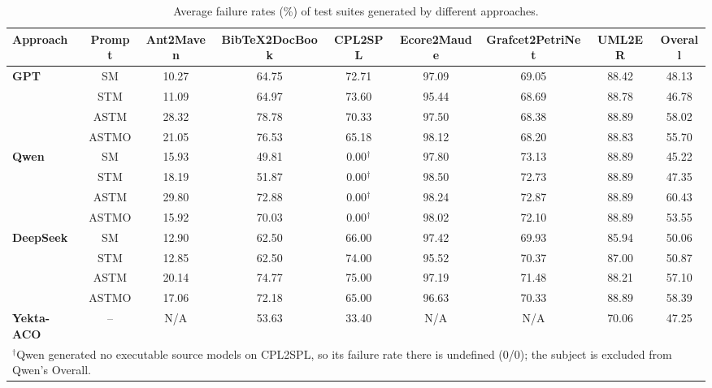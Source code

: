 \begin{table}[t]
\centering
\caption{Average failure rates (\%) of test suites generated by different approaches.}
\label{tab:rq2-failure-rate}
\setlength{\tabcolsep}{3pt}
\begin{tabular}{lcccccccc}
\toprule
\textbf{Approach} & \textbf{Prompt} & \textbf{Ant2Maven} & \textbf{BibTeX2DocBook} & \textbf{CPL2SPL} & \textbf{Ecore2Maude} & \textbf{Grafcet2PetriNet} & \textbf{UML2ER} & \textbf{Overall}\\
\midrule
\multirow{4}{*}{\textbf{GPT}}
  & SM & 10.27 & 64.75 & 72.71 & 97.09 & 69.05 & 88.42 & 48.13 \\
  & STM & 11.09 & 64.97 & 73.60 & 95.44 & 68.69 & 88.78 & 46.78 \\
  & ASTM & 28.32 & 78.78 & 70.33 & 97.50 & 68.38 & 88.89 & 58.02 \\
  & ASTMO & 21.05 & 76.53 & 65.18 & 98.12 & 68.20 & 88.83 & 55.70 \\
\midrule
\multirow{4}{*}{\textbf{Qwen}}
  & SM & 15.93 & 49.81 & 0.00$^{\dagger}$ & 97.80 & 73.13 & 88.89 & 45.22 \\
  & STM & 18.19 & 51.87 & 0.00$^{\dagger}$ & 98.50 & 72.73 & 88.89 & 47.35 \\
  & ASTM & 29.80 & 72.88 & 0.00$^{\dagger}$ & 98.24 & 72.87 & 88.89 & 60.43 \\
  & ASTMO & 15.92 & 70.03 & 0.00$^{\dagger}$ & 98.02 & 72.10 & 88.89 & 53.55 \\
\midrule
\multirow{4}{*}{\textbf{DeepSeek}}
  & SM & 12.90 & 62.50 & 66.00 & 97.42 & 69.93 & 85.94 & 50.06 \\
  & STM & 12.85 & 62.50 & 74.00 & 95.52 & 70.37 & 87.00 & 50.87 \\
  & ASTM & 20.14 & 74.77 & 75.00 & 97.19 & 71.48 & 88.21 & 57.10 \\
  & ASTMO & 17.06 & 72.18 & 65.00 & 96.63 & 70.33 & 88.89 & 58.39 \\
\textbf{Yekta-ACO} & -- & N/A & 53.63 & 33.40 & N/A & N/A & 70.06 & 47.25 \\
\bottomrule
\multicolumn{9}{p{0.98\linewidth}}{\footnotesize $^{\dagger}$Qwen generated no executable source models on CPL2SPL, so its failure rate there is undefined (0/0); the subject is excluded from Qwen's Overall.}
\end{tabular}
\end{table}
